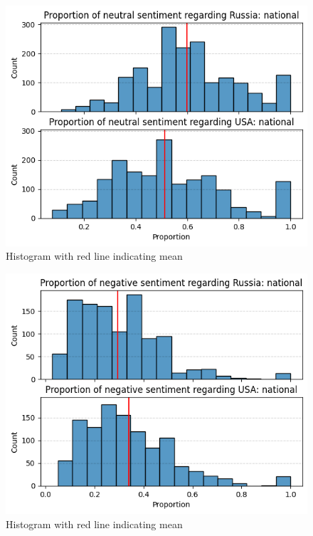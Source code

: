 \documentclass{IEEEtran}
\begin{document}
\begin{figure}
    \centering
    \includegraphics[width=1\linewidth]{figures/sig11.png}
    \caption{Histogram with red line indicating mean}
    \label{fig:neutral_russia_national}
\end{figure}

\begin{figure}
    \centering
    \includegraphics[width=1\linewidth]{figures/sig12.png}
    \caption{Histogram with red line indicating mean}
    \label{fig:negative_russia_national}
\end{figure}
\end{document}
